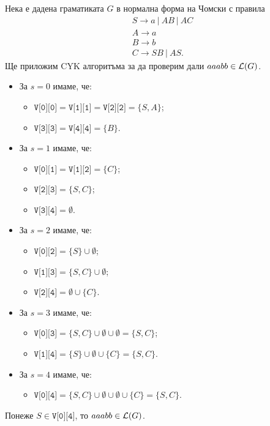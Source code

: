 {\scriptsize

\begin{multicols}{2}
  
\begin{example}
  Нека е дадена граматиката $G$ в нормална форма на Чомски с правила 
  \begin{align*}
    & S\rightarrow a\ |\ AB\ |\ AC\\
    & A\rightarrow a\\
    & B\rightarrow b\\
    & C\rightarrow SB\ |\ AS.
  \end{align*}
  Ще приложим CYK алгоритъма за да проверим дали $aaabb \in \mathcal{L}(G)$.
  
  \begin{itemize}
  \item 
    За $s = 0$ имаме, че:
    \begin{itemize}
    \item 
      $\texttt{V[0][0]} = \texttt{V[1][1]} = \texttt{V[2][2]} = \{S,A\}$;
    \item
      $\texttt{V[3][3]} = \texttt{V[4][4]} = \{B\}$.
    \end{itemize}
  \item
    За $s = 1$ имаме, че:
    \begin{itemize}
    \item
      $\texttt{V[0][1]} = \texttt{V[1][2]} = \{C\}$;
    \item
      $\texttt{V[2][3]} = \{S,C\}$;
    \item
      $\texttt{V[3][4]} = \emptyset$.
    \end{itemize}
  \item
    За $s = 2$ имаме, че:
    \begin{itemize}
    \item
      $\texttt{V[0][2]} = \{S\} \cup \emptyset$;
    \item
      $\texttt{V[1][3]} = \{S,C\} \cup \emptyset$;
    \item
      $\texttt{V[2][4]} = \emptyset \cup \{C\}$.
    \end{itemize}
  \item
    За $s = 3$ имаме, че:
    \begin{itemize}
    \item
      $\texttt{V[0][3]} = \{S,C\} \cup \emptyset \cup \emptyset = \{S,C\}$;
    \item
      $\texttt{V[1][4]} = \{S\} \cup \emptyset \cup \{C\} = \{S,C\}$.
    \end{itemize}
  \item
    За $s = 4$ имаме, че:
    \begin{itemize}
    \item 
      $\texttt{V[0][4]} = \{S,C\} \cup \emptyset \cup \emptyset \cup \{C\}= \{S,C\}$.
    \end{itemize}
  \end{itemize}
  Понеже $S \in \texttt{V[0][4]}$, то $aaabb \in \mathcal{L}(G)$.
\end{example}
\end{multicols}

}

